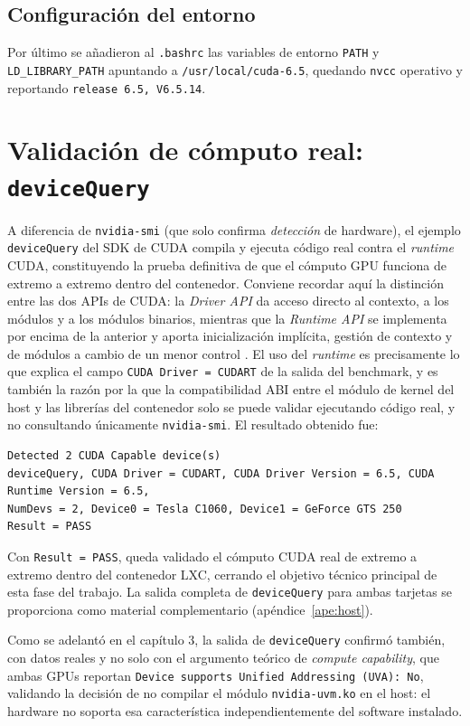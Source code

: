 \subsection{Configuración del entorno}

Por último se añadieron al \texttt{.bashrc} las variables de entorno \texttt{PATH} y \texttt{LD\_LIBRARY\_PATH} apuntando a \texttt{/usr/local/cuda-6.5}, quedando \texttt{nvcc} operativo y reportando \texttt{release 6.5, V6.5.14}.

\section{Validación de cómputo real: \texttt{deviceQuery}}

A diferencia de \texttt{nvidia-smi} (que solo confirma \emph{detección} de hardware), el ejemplo \texttt{deviceQuery} del SDK de CUDA compila y ejecuta código real contra el \textit{runtime} CUDA, constituyendo la prueba definitiva de que el cómputo GPU funciona de extremo a extremo dentro del contenedor. Conviene recordar aquí la distinción entre las dos APIs de CUDA: la \textit{Driver API} da acceso directo al contexto, a los módulos y a los módulos binarios, mientras que la \textit{Runtime API} se implementa por encima de la anterior y aporta inicialización implícita, gestión de contexto y de módulos a cambio de un menor control \cite{nvidia_driver_vs_runtime,so_cuda_driver_runtime}. El uso del \textit{runtime} es precisamente lo que explica el campo \texttt{CUDA Driver = CUDART} de la salida del benchmark, y es también la razón por la que la compatibilidad ABI entre el módulo de kernel del host y las librerías del contenedor solo se puede validar ejecutando código real, y no consultando únicamente \texttt{nvidia-smi}. El resultado obtenido fue:

\begin{lstlisting}[style=bash]
Detected 2 CUDA Capable device(s)
deviceQuery, CUDA Driver = CUDART, CUDA Driver Version = 6.5, CUDA Runtime Version = 6.5,
NumDevs = 2, Device0 = Tesla C1060, Device1 = GeForce GTS 250
Result = PASS
\end{lstlisting}

Con \texttt{Result = PASS}, queda validado el cómputo CUDA real de extremo a extremo dentro del contenedor LXC, cerrando el objetivo técnico principal de esta fase del trabajo. La salida completa de \texttt{deviceQuery} para ambas tarjetas se proporciona como material complementario (apéndice~\ref{ape:host}).

Como se adelantó en el capítulo 3, la salida de \texttt{deviceQuery} confirmó también, con datos reales y no solo con el argumento teórico de \textit{compute capability}, que ambas GPUs reportan \texttt{Device supports Unified Addressing (UVA): No}, validando la decisión de no compilar el módulo \texttt{nvidia-uvm.ko} en el host: el hardware no soporta esa característica independientemente del software instalado.

